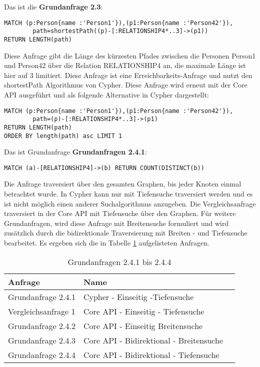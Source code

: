 Das ist die \textbf{Grundanfrage 2.3}: 
\begin{Verbatim}[frame=single]
MATCH (p:Person{name :'Person1'}),(p1:Person{name :'Person42'}),
		path=shortestPath((p)-[:RELATIONSHIP4*..3]->(p1)) 
RETURN LENGTH(path)
\end{Verbatim} 
Diese Anfrage gibt die Länge des kürzesten Pfades zwischen die Personen Person1 und Person42 über die Relation RELATIONSHIP4 an, die maximale Länge ist hier auf 3 limitiert. Diese Anfrage ist eine Erreichbarkeits-Anfrage und nutzt den shortestPath Algorithmus von Cypher. Diese Anfrage wird erneut mit der Core API ausgeführt und als folgende Alternative in Cypher dargestellt: 
\begin{Verbatim}[frame=single]
MATCH (p:Person{name :'Person1'}),(p1:Person{name :'Person42'}),
		path=(p)-[:RELATIONSHIP4*..3]->(p1) 
RETURN LENGTH(path)
ORDER BY length(path) asc LIMIT 1
\end{Verbatim}
 Das ist Grundanfrage \textbf{Grundanfragen 2.4.1}:
 \begin{Verbatim}[frame=single]
 MATCH (a)-[RELATIONSHIP4]->(b) RETURN COUNT(DISTINCT(b))
 \end{Verbatim}
Die Anfrage traversiert über den gesamten Graphen, bis jeder Knoten einmal betrachtet wurde. In Cypher kann nur mit Tiefensuche traversiert werden und es ist nicht möglich einen anderer Suchalgorithmus anzugeben. Die Vergleichsanfrage traversiert in der Core API mit Tiefensuche über den Graphen. Für weitere Grundanfragen, wird diese Anfrage mit  Breitensuche formuliert und wird zusätzlich durch die bidirektionale Traversierung mit Breiten - und Tiefensuche bearbeitet. Es ergeben sich die in  Tabelle \ref{tab:Intro_Query2_4} aufgelisteten Anfragen. 
\FloatBarrier
\begin{table}[h]
	\centering
	\begin{tabular}{ |p{5cm}||p{7cm}|p{3cm}  }
		\hline
		Anfrage& Name\\
		\hline
		Grundanfrage 2.4.1 &  Cypher - Einseitig -Tiefensuche\\
		Vergleichsanfrage 1 &  Core API - Einseitig - Tiefensuche \\
		Grundanfrage 2.4.2 &  Core API - Einseitig Breitensuche\\
		Grundanfrage 2.4.3&  Core API - Bidirektional - Breitensuche\\
		Grundanfrage 2.4.4 &  Core API -  Bidirektional - Tiefensuche\\
		\hline
	\end{tabular}
	\caption{Grundanfragen 2.4.1 bis 2.4.4}
	\label{tab:Intro_Query2_4}
\end{table}
\FloatBarrier
